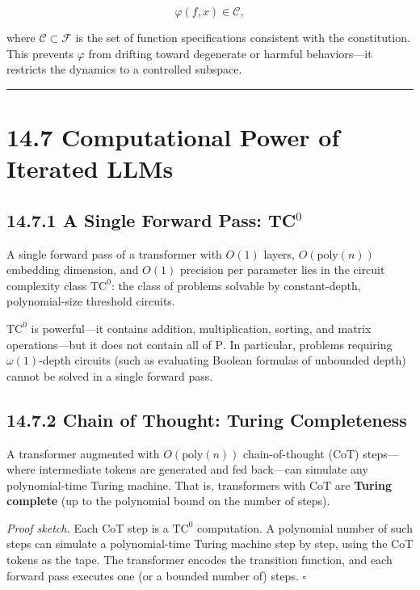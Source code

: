 \[
\varphi(f, x) \in \mathcal{C},
\]

where $\mathcal{C} \subset \mathcal{F}$ is the set of function specifications consistent with the constitution. This prevents $\varphi$ from drifting toward degenerate or harmful behaviors---it restricts the dynamics to a controlled subspace.

\bigskip\hrule\bigskip

\section{14.7 Computational Power of Iterated LLMs}

\subsection{14.7.1 A Single Forward Pass: TC$^0$}

\begin{theorem}
A single forward pass of a transformer with $O(1)$ layers, $O(\mathrm{poly}(n))$ embedding dimension, and $O(1)$ precision per parameter lies in the circuit complexity class $\mathrm{TC}^0$: the class of problems solvable by constant-depth, polynomial-size threshold circuits.

$\mathrm{TC}^0$ is powerful---it contains addition, multiplication, sorting, and matrix operations---but it does not contain all of $\mathrm{P}$. In particular, problems requiring $\omega(1)$-depth circuits (such as evaluating Boolean formulas of unbounded depth) cannot be solved in a single forward pass.
\end{theorem}

\subsection{14.7.2 Chain of Thought: Turing Completeness}

\begin{theorem}
A transformer augmented with $O(\mathrm{poly}(n))$ chain-of-thought (CoT) steps---where intermediate tokens are generated and fed back---can simulate any polynomial-time Turing machine. That is, transformers with CoT are \textbf{Turing complete} (up to the polynomial bound on the number of steps).

\textit{Proof sketch.} Each CoT step is a $\mathrm{TC}^0$ computation. A polynomial number of such steps can simulate a polynomial-time Turing machine step by step, using the CoT tokens as the tape. The transformer encodes the transition function, and each forward pass executes one (or a bounded number of) steps. $\square$
\end{theorem}

